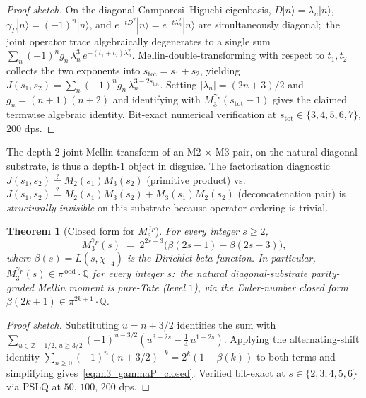 \documentclass[11pt,a4paper]{article}
\theoremstyle{plain}
\newtheorem{theorem}{Theorem}[section]
\theoremstyle{definition}
\newcommand{\Z}{\mathbb{Z}}
\newcommand{\Q}{\mathbb{Q}}
\begin{document}
\begin{proof}[Proof sketch]
On the diagonal Camporesi--Higuchi eigenbasis,
$D|n\rangle = \lambda_n |n\rangle$,
$\gamma_P |n\rangle = (-1)^n |n\rangle$, and
$e^{-t D^2}|n\rangle = e^{-t \lambda_n^2}|n\rangle$ are
simultaneously diagonal;\ the joint operator trace algebraically
degenerates to a single sum
$\sum_n (-1)^n g_n\, \lambda_n^3\, e^{-(t_1 + t_2)\lambda_n^2}$.
Mellin-double-transforming with respect to $t_1, t_2$ collects
the two exponents into $s_{\mathrm{tot}} = s_1 + s_2$, yielding
$J(s_1, s_2) = \sum_n (-1)^n g_n\, \lambda_n^{3 - 2 s_{\mathrm{tot}}}$.
Setting $|\lambda_n| = (2n + 3)/2$ and $g_n = (n + 1)(n + 2)$ and
identifying with $M_3^{\gamma_P}(s_{\mathrm{tot}} - 1)$ gives the
claimed termwise algebraic identity. Bit-exact numerical
verification at $s_{\mathrm{tot}} \in \{3, 4, 5, 6, 7\}$, $200$ dps.
\end{proof}

The depth-$2$ joint Mellin transform of an M2 $\times$ M3 pair, on
the natural diagonal substrate, is thus a depth-$1$ object in
disguise. The factorisation diagnostic
$J(s_1, s_2) \overset?= M_2(s_1) M_3(s_2)$ (primitive product) vs.\
$J(s_1, s_2) \overset?= M_2(s_1) M_3(s_2) + M_3(s_1) M_2(s_2)$
(deconcatenation pair) is \emph{structurally invisible} on this
substrate because operator ordering is trivial.

\begin{theorem}[Closed form for $M_3^{\gamma_P}$]
\label{thm:m3_gammaP_closed_form}
For every integer $s \ge 2$,
\begin{equation}
\label{eq:m3_gammaP_closed}
M_3^{\gamma_P}(s) \;=\; 2^{2s - 3}\big(\beta(2s - 1) - \beta(2s - 3)\big),
\end{equation}
where $\beta(s) = L(s, \chi_{-4})$ is the Dirichlet beta function.
In particular, $M_3^{\gamma_P}(s) \in \pi^{\,\mathrm{odd}}\cdot\Q$ for
every integer $s$:\ the natural diagonal-substrate parity-graded
Mellin moment is \emph{pure-Tate} (level $1$), via the Euler-number
closed form $\beta(2k + 1) \in \pi^{2k + 1}\cdot\Q$.
\end{theorem}

\begin{proof}[Proof sketch]
Substituting $u = n + 3/2$ identifies the sum with
$\sum_{u \in \Z + 1/2,\, u \ge 3/2} (-1)^{u - 3/2}
(u^{3 - 2s} - \tfrac14\, u^{1 - 2s})$.  Applying the alternating-shift
identity $\sum_{n \ge 0}(-1)^n (n + 3/2)^{-k} = 2^k (1 - \beta(k))$
to both terms and simplifying gives~\eqref{eq:m3_gammaP_closed}.
Verified bit-exact at $s \in \{2, 3, 4, 5, 6\}$ via PSLQ at $50$,
$100$, $200$ dps.
\end{proof}
\end{document}
